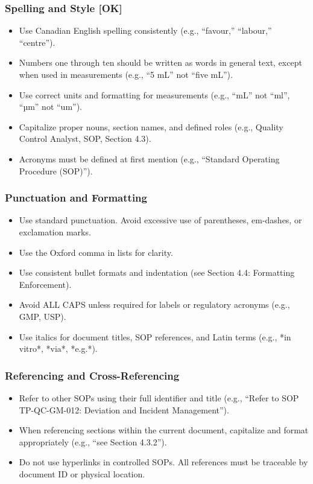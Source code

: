 \documentclass[11pt]{article}
\begin{document}
\subsubsection{Spelling and Style [OK]}
\begin{itemize}
    \item Use Canadian English spelling consistently (e.g., “favour,” “labour,” “centre”).
    \item Numbers one through ten should be written as words in general text, except when used in measurements (e.g., “5 mL” not “five mL”).
    \item Use correct units and formatting for measurements (e.g., “mL” not “ml”, “µm” not “um”).
    \item Capitalize proper nouns, section names, and defined roles (e.g., Quality Control Analyst, SOP, Section 4.3).
    \item Acronyms must be defined at first mention (e.g., “Standard Operating Procedure (SOP)”).
\end{itemize}

\subsubsection{Punctuation and Formatting}
\begin{itemize}
    \item Use standard punctuation. Avoid excessive use of parentheses, em-dashes, or exclamation marks.
    \item Use the Oxford comma in lists for clarity.
    \item Use consistent bullet formats and indentation (see Section 4.4: Formatting Enforcement).
    \item Avoid ALL CAPS unless required for labels or regulatory acronyms (e.g., GMP, USP).
    \item Use italics for document titles, SOP references, and Latin terms (e.g., *in vitro*, *via*, *e.g.*).
\end{itemize}

\subsubsection{Referencing and Cross-Referencing}
\begin{itemize}
    \item Refer to other SOPs using their full identifier and title (e.g., “Refer to SOP TP-QC-GM-012: Deviation and Incident Management”).
    \item When referencing sections within the current document, capitalize and format appropriately (e.g., “see Section 4.3.2”).
    \item Do not use hyperlinks in controlled SOPs. All references must be traceable by document ID or physical location.
\end{itemize}
\end{document}

